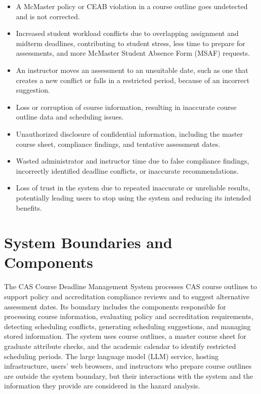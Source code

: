 \documentclass{article}
\begin{document}
\begin{itemize}
    \item A McMaster policy or CEAB violation in a course outline goes undetected and is not corrected.
    \item Increased student workload conflicts due to overlapping assignment and midterm deadlines, contributing to student stress, less time to prepare for assessments, and more McMaster Student Absence Form (MSAF) requests.
    \item An instructor moves an assessment to an unsuitable date, such as one that creates a new conflict or falls in a restricted period, because of an incorrect suggestion.
    \item Loss or corruption of course information, resulting in inaccurate course outline data and scheduling issues.
    \item Unauthorized disclosure of confidential information, including the master course sheet, compliance findings, and tentative assessment dates.
    \item Wasted administrator and instructor time due to false compliance findings, incorrectly identified deadline conflicts, or inaccurate recommendations.
    \item Loss of trust in the system due to repeated inaccurate or unreliable results, potentially leading users to stop using the system and reducing its intended benefits.
\end{itemize}


\section{System Boundaries and Components} \label{sec_Boundaries}


The CAS Course Deadline Management System processes CAS course outlines to support policy and accreditation 
compliance reviews and to suggest alternative assessment dates. Its boundary includes the components responsible for processing course 
information, evaluating policy and accreditation requirements, detecting scheduling conflicts, generating scheduling 
suggestions, and managing stored information. The system uses course outlines, a master course sheet for graduate 
attribute checks, and the academic calendar to identify restricted scheduling periods. The large language model (LLM) service, 
hosting infrastructure, users' web browsers, and instructors who prepare course outlines are outside the system 
boundary, but their interactions with the system and the information they provide are considered in the hazard analysis.
\end{document}
